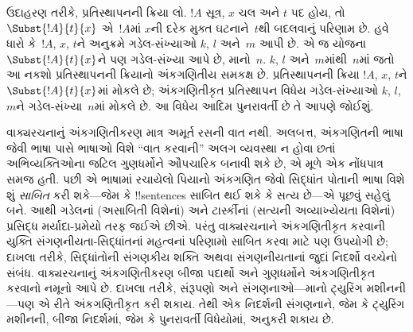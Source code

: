 \documentclass[../../../include/open-logic-section]{subfiles}
\begin{document}
ઉદાહરણ તરીકે, પ્રતિસ્થાપનની ક્રિયા લો.
$!A$ સૂત્ર, $x$ ચલ અને $t$ પદ હોય,
તો~$\Subst{!A}{t}{x}$ એ~$!A$માં
$x$ની દરેક મુક્ત ઘટનાને~$t$થી
બદલવાનું પરિણામ છે. હવે ધારો કે~$!A$,
$x$, $t$ને અનુક્રમે ગડેલ-સંખ્યાઓ
$k$, $l$ અને~$m$ આપી છે. એ જ
યોજના~$\Subst{!A}{t}{x}$ને પણ
ગડેલ-સંખ્યા આપે છે, માનો~$n$.
$k$, $l$ અને~$m$માંથી~$n$માં
જતો આ નકશો પ્રતિસ્થાપનની ક્રિયાનો
અંકગણિતીય સમકક્ષ છે. પ્રતિસ્થાપનની
ક્રિયા $!A$, $x$, $t$ને
$\Subst{!A}{t}{x}$માં મોકલે છે;
અંકગણિતીકૃત પ્રતિસ્થાપન વિધેય
ગડેલ-સંખ્યાઓ $k$, $l$, $m$ને
ગડેલ-સંખ્યા~$n$માં મોકલે છે.
આ વિધેય આદિમ પુનરાવર્તી છે તે આપણે
જોઈશું.

વાક્યરચનાનું અંકગણિતીકરણ માત્ર અમૂર્ત
રસની વાત નથી. અલબત્ત, અંકગણિતની ભાષા
જેવી ભાષા પાસે ભાષાઓ વિશે ``વાત કરવાની''
અલગ વ્યવસ્થા ન હોવા છતાં અભિવ્યક્તિઓના
જટિલ ગુણધર્મોને ઔપચારિક બનાવી શકે છે,
એ મૂળે એક નોંધપાત્ર સમજ હતી. પછી એ
ભાષામાં રચાયેલો પિયાનો અંકગણિત જેવો
સિદ્ધાંત પોતાની ભાષા વિશે શું \emph{સાબિત}
કરી શકે—જેમ કે !!{sentence}s સાબિત
થઈ શકે કે સત્ય છે—એ પૂછવું સહેલું બને.
આથી ગડેલનાં (અસાબિતી વિશેનાં) અને
ટાર્સ્કીનાં (સત્યની અવ્યાખ્યેયતા વિશેનાં)
પ્રસિદ્ધ મર્યાદા-પ્રમેયો તરફ જઈએ છીએ.
પરંતુ વાક્યરચનાને અંકગણિતીકૃત કરવાની
યુક્તિ સંગણનીયતા-સિદ્ધાંતનાં મહત્વનાં
પરિણામો સાબિત કરવા માટે પણ ઉપયોગી છે;
દાખલા તરીકે, સિદ્ધાંતોની સંગણકીય શક્તિ
અથવા સંગણનીયતાનાં જુદાં નિદર્શો વચ્ચેનો
સંબંધ. વાક્યરચનાનું અંકગણિતીકરણ બીજા
પદાર્થો અને ગુણધર્મોને અંકગણિતીકૃત કરવાનો
નમૂનો આપે છે. દાખલા તરીકે, સંરૂપણો
અને સંગણનાઓ—માનો ટ્યુરિંગ મશીનની—પણ
એ રીતે અંકગણિતીકૃત કરી શકાય. તેથી
એક નિદર્શની સંગણનાને, જેમ કે ટ્યુરિંગ
મશીનની, બીજા નિદર્શમાં, જેમ કે પુનરાવર્તી
વિધેયોમાં, અનુકરી શકાય છે.
\end{document}
